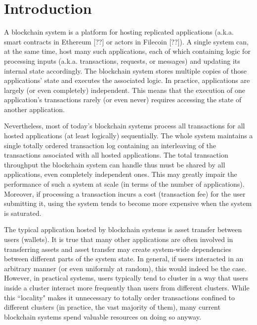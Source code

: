 \section{Introduction}
\label{sec:introduction}

A blockchain system is a platform for hosting replicated applications (a.k.a. smart contracts in Ethereum [??] or actors in Filecoin [??]).
A single system can, at the same time, host many such applications,
each of which containing logic for processing inputs (a.k.a. transactions, requests, or messages) and updating its internal state accordingly.
The blockchain system stores multiple copies of those applications' state and executes the associated logic.
In practice, applications are largely (or even completely) independent.
This means that the execution of one application's transactions rarely (or even never) requires accessing the state of another application.

Nevertheless, most of today's blockchain systems process all transactions for all hosted applications (at least logically) sequentially.
The whole system maintains a single totally ordered transaction log containing an interleaving of the transactions associated with all hosted applications.
The total transaction throughput the blockchain system can handle thus must be shared by all applications, even completely independent ones.
This may greatly impair the performance of such a system at scale (in terms of the number of applications).
Moreover, if processing a transaction incurs a cost (transaction fee) for the user submitting it, using the system tends to become more expensive when the system is saturated.

The typical application hosted by blockchain systems is asset transfer between users (wallets).
It is true that many other applications are often involved in transferring assets and asset transfer may create system-wide dependencies between different parts of the system state.
In general, if users interacted in an arbitrary manner (or even uniformly at random), this would indeed be the case.
However, in practical systems, users typically tend to cluster in a way that users inside a cluster interact more frequently than users from different clusters.
While this ``locality" makes it unnecessary to totally order transactions confined to different clusters (in practice, the vast majority of them),
many current blockchain systems spend valuable resources on doing so anyway.

